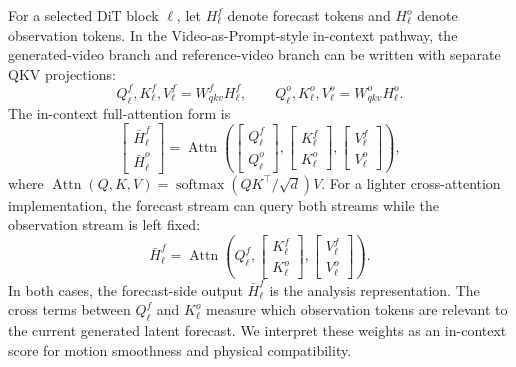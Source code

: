 \documentclass{article}
\begin{document}
For a selected DiT block $\ell$, let $H_{\ell}^{f}$ denote forecast tokens and $H_{\ell}^{o}$ denote observation tokens. In the Video-as-Prompt-style in-context pathway, the generated-video branch and reference-video branch can be written with separate QKV projections:
\begin{equation}
    Q_{\ell}^{f},K_{\ell}^{f},V_{\ell}^{f}
    =
    W_{qkv}^{f} H_{\ell}^{f},
    \qquad
    Q_{\ell}^{o},K_{\ell}^{o},V_{\ell}^{o}
    =
    W_{qkv}^{o} H_{\ell}^{o}.
\end{equation}
The in-context full-attention form is
\begin{equation}
    \begin{bmatrix}
    \bar{H}_{\ell}^{f}\\
    \bar{H}_{\ell}^{o}
    \end{bmatrix}
    =
    \operatorname{Attn}\!\left(
    \begin{bmatrix}Q_{\ell}^{f}\\Q_{\ell}^{o}\end{bmatrix},
    \begin{bmatrix}K_{\ell}^{f}\\K_{\ell}^{o}\end{bmatrix},
    \begin{bmatrix}V_{\ell}^{f}\\V_{\ell}^{o}\end{bmatrix}
    \right),
    \label{eq:full-da-attn}
\end{equation}
where $\operatorname{Attn}(Q,K,V)=\operatorname{softmax}(QK^\top/\sqrt{d})V$. For a lighter cross-attention implementation, the forecast stream can query both streams while the observation stream is left fixed:
\begin{equation}
    \bar{H}_{\ell}^{f}
    =
    \operatorname{Attn}\!\left(
    Q_{\ell}^{f},
    \begin{bmatrix}K_{\ell}^{f}\\K_{\ell}^{o}\end{bmatrix},
    \begin{bmatrix}V_{\ell}^{f}\\V_{\ell}^{o}\end{bmatrix}
    \right).
    \label{eq:cross-da-attn}
\end{equation}
In both cases, the forecast-side output $\bar{H}_{\ell}^{f}$ is the analysis representation. The cross terms between $Q_{\ell}^{f}$ and $K_{\ell}^{o}$ measure which observation tokens are relevant to the current generated latent forecast. We interpret these weights as an in-context score for motion smoothness and physical compatibility.
\end{document}

